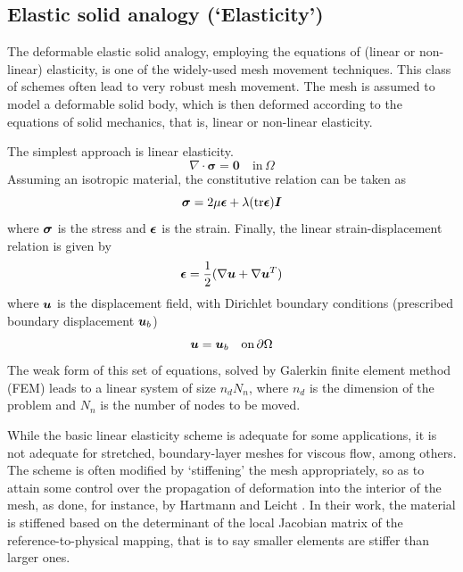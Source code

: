  \subsection{Elastic solid analogy (`Elasticity')}
 
 The deformable elastic solid analogy, employing the equations of (linear or non-linear) elasticity, is one of the widely-used mesh movement techniques. This class of schemes often lead to very robust mesh movement. The mesh is assumed to model a deformable solid body, which is then deformed according to the equations of solid mechanics, that is, linear or non-linear elasticity.
 
 The simplest approach is linear elasticity.
 \begin{equation}
 \nabla \cdot \mathbf{\sigma}  = \mathbf{0} \quad \text{in} \, \Omega
 \end{equation}
 Assuming an isotropic material, the constitutive relation can be taken as
 \begin{equation}
 \boldsymbol{\sigma} = 2\mu\boldsymbol{\epsilon} + \lambda (\mathrm{tr}\boldsymbol{\epsilon}) \boldsymbol{I}
 \label{linelast:constt}
 \end{equation}
 where $\boldsymbol{\sigma}$ is the stress and $\boldsymbol{\epsilon}$ is the strain.
 Finally, the linear strain-displacement relation is given by
 \begin{equation}
 \boldsymbol{\epsilon} = \frac12 (\nabla\boldsymbol{u}+\nabla\boldsymbol{u}^T)
 \label{linelast:strain}
 \end{equation}
 where $\boldsymbol{u}$ is the displacement field, with Dirichlet boundary conditions (prescribed boundary displacement $\boldsymbol{u}_b$)
 \begin{equation}
 \boldsymbol{u} = \boldsymbol{u}_b \quad \text{on} \, \partial\Omega
 \end{equation}
 The weak form of this set of equations, solved by Galerkin finite element method (FEM) leads to a linear system of size $n_d N_n$, where $n_d$ is the dimension of the problem and $N_n$ is the number of nodes to be moved.
 
 While the basic linear elasticity scheme is adequate for some applications, it is not adequate for stretched, boundary-layer meshes for viscous flow, among others. The scheme is often modified by `stiffening' the mesh appropriately, so as to attain some control over the propagation of deformation into the interior of the mesh, as done, for instance, by Hartmann and Leicht \cite{curve:hartmann}. In their work, the material is stiffened based on the determinant of the local Jacobian matrix of the reference-to-physical mapping, that is to say smaller elements are stiffer than larger ones.
 
